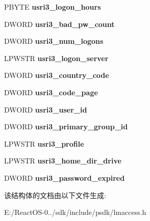 \begin{DoxyCompactItemize}
\item 
\mbox{\label{struct___u_s_e_r___i_n_f_o__3_a055bce90144571cd1685facc853f122d}} 
P\+B\+Y\+TE {\bfseries usri3\+\_\+logon\+\_\+hours}
\item 
\mbox{\label{struct___u_s_e_r___i_n_f_o__3_acd590abb397e6742d33dd63b1045ef60}} 
D\+W\+O\+RD {\bfseries usri3\+\_\+bad\+\_\+pw\+\_\+count}
\item 
\mbox{\label{struct___u_s_e_r___i_n_f_o__3_a401da5d5e06c453277fb440633b84f00}} 
D\+W\+O\+RD {\bfseries usri3\+\_\+num\+\_\+logons}
\item 
\mbox{\label{struct___u_s_e_r___i_n_f_o__3_aa72324882556054fc2d433414365715d}} 
L\+P\+W\+S\+TR {\bfseries usri3\+\_\+logon\+\_\+server}
\item 
\mbox{\label{struct___u_s_e_r___i_n_f_o__3_a931f165f4d47073eec6b2ae1f21f8bc5}} 
D\+W\+O\+RD {\bfseries usri3\+\_\+country\+\_\+code}
\item 
\mbox{\label{struct___u_s_e_r___i_n_f_o__3_a97ec3a5d72e9572d30956ff490e0e804}} 
D\+W\+O\+RD {\bfseries usri3\+\_\+code\+\_\+page}
\item 
\mbox{\label{struct___u_s_e_r___i_n_f_o__3_a0bcd5c8cbb41747a8ffc31530346c3c7}} 
D\+W\+O\+RD {\bfseries usri3\+\_\+user\+\_\+id}
\item 
\mbox{\label{struct___u_s_e_r___i_n_f_o__3_a91ae93e484194e908f0249c3f2fc023d}} 
D\+W\+O\+RD {\bfseries usri3\+\_\+primary\+\_\+group\+\_\+id}
\item 
\mbox{\label{struct___u_s_e_r___i_n_f_o__3_aecc4f5dddb570561bae70c96c421f77b}} 
L\+P\+W\+S\+TR {\bfseries usri3\+\_\+profile}
\item 
\mbox{\label{struct___u_s_e_r___i_n_f_o__3_a7c2d7facb2016684f6dcfd69b03c5dc9}} 
L\+P\+W\+S\+TR {\bfseries usri3\+\_\+home\+\_\+dir\+\_\+drive}
\item 
\mbox{\label{struct___u_s_e_r___i_n_f_o__3_a9e3ed132727eca651e3fa02cc1e2a047}} 
D\+W\+O\+RD {\bfseries usri3\+\_\+password\+\_\+expired}
\end{DoxyCompactItemize}


该结构体的文档由以下文件生成\+:\begin{DoxyCompactItemize}
\item 
E\+:/\+React\+O\+S-\/0../sdk/include/psdk/lmaccess.\+h\end{DoxyCompactItemize}
